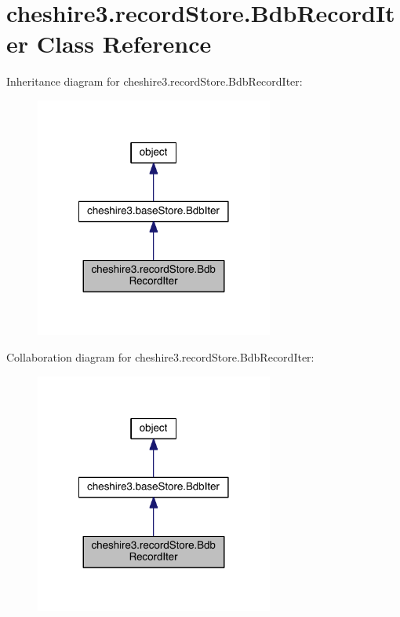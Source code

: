 \hypertarget{classcheshire3_1_1record_store_1_1_bdb_record_iter}{\section{cheshire3.\-record\-Store.\-Bdb\-Record\-Iter Class Reference}
\label{classcheshire3_1_1record_store_1_1_bdb_record_iter}
}


Inheritance diagram for cheshire3.\-record\-Store.\-Bdb\-Record\-Iter\-:
\nopagebreak
\begin{figure}[H]
\begin{center}
\leavevmode
\includegraphics[width=222pt]{classcheshire3_1_1record_store_1_1_bdb_record_iter__inherit__graph}
\end{center}
\end{figure}


Collaboration diagram for cheshire3.\-record\-Store.\-Bdb\-Record\-Iter\-:
\nopagebreak
\begin{figure}[H]
\begin{center}
\leavevmode
\includegraphics[width=222pt]{classcheshire3_1_1record_store_1_1_bdb_record_iter__coll__graph}
\end{center}
\end{figure}
